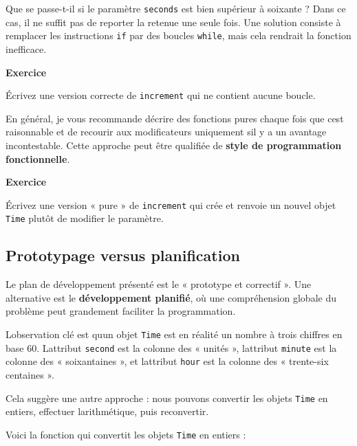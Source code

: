 Que se passe-t-il si le paramètre \texttt{seconds} est bien supérieur à
soixante ? Dans ce cas, il ne suffit pas de reporter la retenue une
seule fois. Une solution consiste à remplacer les instructions
\texttt{if} par des boucles \texttt{while}, mais cela rendrait la
fonction inefficace.

\textbf{Exercice}

Écrivez une version correcte de \texttt{increment} qui ne contient
aucune boucle.

En général, je vous recommande d\textquotesingle écrire des fonctions
pures chaque fois que c\textquotesingle est raisonnable et de recourir
aux modificateurs uniquement s\textquotesingle il y a un avantage
incontestable. Cette approche peut être qualifiée de \textbf{style de
programmation fonctionnelle}.

\textbf{Exercice}

Écrivez une version « pure » de \texttt{increment} qui crée et renvoie
un nouvel objet \texttt{Time} plutôt de modifier le paramètre.

\hypertarget{prototypage-versus-planification}{%
\subsection{Prototypage versus
planification}\label{prototypage-versus-planification}}

Le plan de développement présenté est le « prototype et correctif ». Une
alternative est le \textbf{développement planifié}, où une compréhension
globale du problème peut grandement faciliter la programmation.

L\textquotesingle observation clé est qu\textquotesingle un objet
\texttt{Time} est en réalité un nombre à trois chiffres en base 60.
L\textquotesingle attribut \texttt{second} est la colonne des « unités
», l\textquotesingle attribut \texttt{minute} est la colonne des «
soixantaines », et l\textquotesingle attribut \texttt{hour} est la
colonne des « trente-six centaines ».

Cela suggère une autre approche : nous pouvons convertir les objets
\texttt{Time} en entiers, effectuer l\textquotesingle arithmétique, puis
reconvertir.

Voici la fonction qui convertit les objets \texttt{Time} en entiers :

\begin{Shaded}
\begin{Highlighting}[]
\OperatorTok{=}\OperatorTok{*}  \OperatorTok{+}
\OperatorTok{=}\OperatorTok{*}  \OperatorTok{+}
\end{Highlighting}
\end{Shaded}

